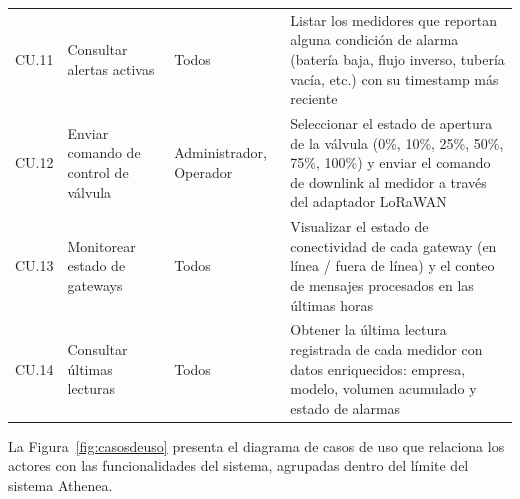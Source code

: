 \documentclass[12pt,a4paper,oneside]{report}
\begin{document}
\begin{longtable}{p{1.0cm}p{3.8cm}p{3.2cm}p{5.5cm}}
CU.11 & Consultar alertas activas & Todos & Listar los medidores que reportan alguna condición de alarma (batería baja, flujo inverso, tubería vacía, etc.) con su timestamp más reciente \\
CU.12 & Enviar comando de control de válvula & Administrador, Operador & Seleccionar el estado de apertura de la válvula (0\%, 10\%, 25\%, 50\%, 75\%, 100\%) y enviar el comando de downlink al medidor a través del adaptador LoRaWAN \\
CU.13 & Monitorear estado de gateways & Todos & Visualizar el estado de conectividad de cada gateway (en línea / fuera de línea) y el conteo de mensajes procesados en las últimas horas \\
CU.14 & Consultar últimas lecturas & Todos & Obtener la última lectura registrada de cada medidor con datos enriquecidos: empresa, modelo, volumen acumulado y estado de alarmas \\
\end{longtable}

La Figura~\ref{fig:casosdeuso} presenta el diagrama de casos de uso que relaciona los actores con las funcionalidades del sistema, agrupadas dentro del límite del sistema Athenea.
\end{document}
